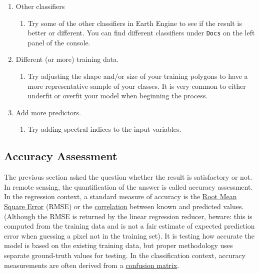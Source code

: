 \documentclass[
]{article}
\providecommand{\tightlist}{%
  \setlength{\itemsep}{0pt}\setlength{\parskip}{0pt}}
\begin{document}
\begin{enumerate}
\def\labelenumi{\arabic{enumi}.}
\tightlist
\item
  Other classifiers

  \begin{enumerate}
  \def\labelenumii{\arabic{enumii}.}
  \tightlist
  \item
    Try some of the other classifiers in Earth Engine to see if the result is better or different. You can find different classifiers under \texttt{Docs} on the left panel of the console.
  \end{enumerate}
\item
  Different (or more) training data.

  \begin{enumerate}
  \def\labelenumii{\arabic{enumii}.}
  \tightlist
  \item
    Try adjusting the shape and/or size of your training polygons to have a more representative sample of your classes. It is very common to either underfit or overfit your model when beginning the process.
  \end{enumerate}
\item
  Add more predictors.

  \begin{enumerate}
  \def\labelenumii{\arabic{enumii}.}
  \tightlist
  \item
    Try adding spectral indices to the input variables.
  \end{enumerate}
\end{enumerate}

\hypertarget{accuracy-assessment}{%
\subsection{Accuracy Assessment}\label{accuracy-assessment}}

The previous section asked the question whether the result is satisfactory or not. In remote sensing, the quantification of the answer is called accuracy assessment. In the regression context, a standard measure of accuracy is the \href{https://en.wikipedia.org/wiki/Root-mean-square_deviation}{Root Mean Square Error} (RMSE) or the \href{https://en.wikipedia.org/wiki/Correlation_and_dependence}{correlation} between known and predicted values. (Although the RMSE is returned by the linear regression reducer, beware: this is computed from the training data and is not a fair estimate of expected prediction error when guessing a pixel not in the training set). It is testing how accurate the model is based on the existing training data, but proper methodology uses separate ground-truth values for testing. In the classification context, accuracy measurements are often derived from a \href{https://en.wikipedia.org/wiki/Confusion_matrix}{confusion matrix}.
\end{document}
